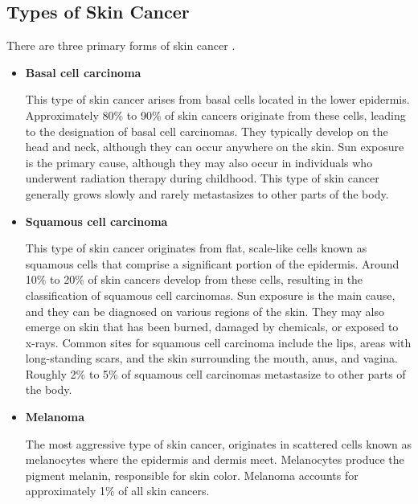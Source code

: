 \subsection{Types of Skin Cancer}

There are three primary forms of skin cancer \cite{BaseCancerKnowledge}.
\newline

\begin{itemize} \item \textbf{Basal cell carcinoma}

      This type of skin cancer arises from basal cells located in the lower
      epidermis. Approximately 80\% to 90\% of skin cancers originate from
      these cells, leading to the designation of basal cell carcinomas. They
      typically develop on the head and neck, although they can occur anywhere
      on the skin. Sun exposure is the primary cause, although they may also
      occur in individuals who underwent radiation therapy during childhood.
      This type of skin cancer generally grows slowly and rarely metastasizes
      to other parts of the body. \newline

    \item \textbf{Squamous cell carcinoma}

      This type of skin cancer originates from flat, scale-like cells known as
      squamous cells that comprise a significant portion of the epidermis.
      Around 10\% to 20\% of skin cancers develop from these cells, resulting
      in the classification of squamous cell carcinomas. Sun exposure is the
      main cause, and they can be diagnosed on various regions of the skin.
      They may also emerge on skin that has been burned, damaged by chemicals,
      or exposed to x-rays. Common sites for squamous cell carcinoma include
      the lips, areas with long-standing scars, and the skin surrounding the
      mouth, anus, and vagina. Roughly 2\% to 5\% of squamous cell carcinomas
      metastasize to other parts of the body. \newline

    \item \textbf{Melanoma}

      The most aggressive type of skin cancer, originates in scattered cells
      known as melanocytes where the epidermis and dermis meet. Melanocytes
      produce the pigment melanin, responsible for skin color. Melanoma
      accounts for approximately 1\% of all skin cancers.

\end{itemize} \newpage

